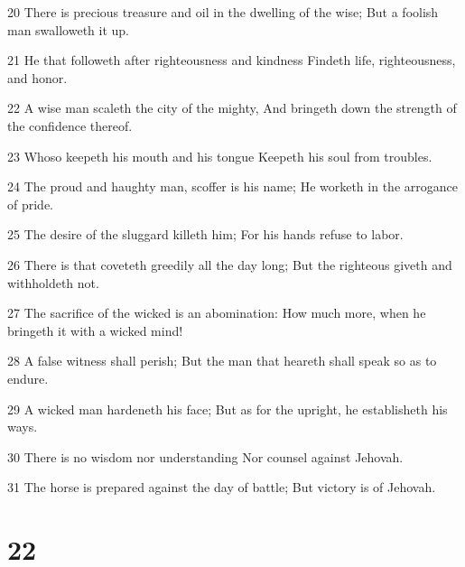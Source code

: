 \par 20 There is precious treasure and oil in the dwelling of the wise; But a foolish man swalloweth it up.
\par 21 He that followeth after righteousness and kindness Findeth life, righteousness, and honor.
\par 22 A wise man scaleth the city of the mighty, And bringeth down the strength of the confidence thereof.
\par 23 Whoso keepeth his mouth and his tongue Keepeth his soul from troubles.
\par 24 The proud and haughty man, scoffer is his name; He worketh in the arrogance of pride.
\par 25 The desire of the sluggard killeth him; For his hands refuse to labor.
\par 26 There is that coveteth greedily all the day long; But the righteous giveth and withholdeth not.
\par 27 The sacrifice of the wicked is an abomination: How much more, when he bringeth it with a wicked mind!
\par 28 A false witness shall perish; But the man that heareth shall speak so as to endure.
\par 29 A wicked man hardeneth his face; But as for the upright, he establisheth his ways.
\par 30 There is no wisdom nor understanding Nor counsel against Jehovah.
\par 31 The horse is prepared against the day of battle; But victory is of Jehovah.

\chapter{22}

